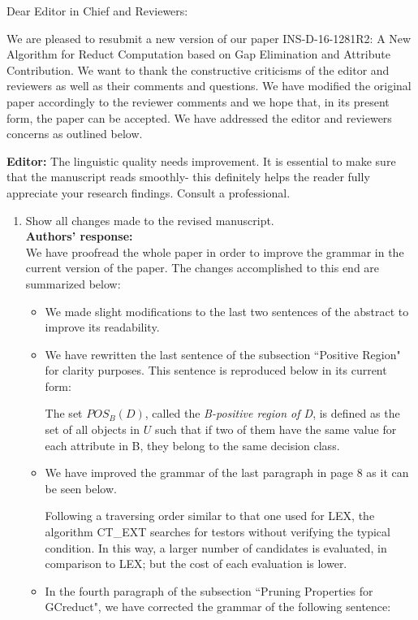 \documentclass{letter}
\begin{document}
\begin{letter}{}
  \opening{Dear Editor in Chief and Reviewers:}

  We are pleased to resubmit a new version of our paper INS-D-16-1281R2: A New Algorithm for Reduct Computation based on Gap Elimination and Attribute Contribution. We want to thank the constructive criticisms of the editor and reviewers as well as their comments and questions. We have modified the original paper accordingly to the reviewer comments and we hope that, in its present form, the paper can be accepted. We have addressed the editor and reviewers concerns as outlined below.

  \textbf{Editor:} 
  The linguistic quality needs improvement. It is essential to make sure that  the manuscript reads smoothly- this definitely helps the reader fully appreciate your research findings. Consult a professional. 
  \begin{enumerate}
	\item Show all changes made to the revised manuscript. \\
	\textbf{Authors’ response:} \\
	We have proofread the whole paper in order to improve the grammar in the current version of the paper. The changes accomplished to this end are summarized below:
	\begin{itemize}		
		\item We made slight modifications to the last two sentences of the abstract to improve its readability.
		 
		\item We have rewritten the last sentence of the subsection ``Positive Region"  for clarity purposes. This sentence is reproduced below in its current form:
		
		The set $POS_B(D)$, called the \textit{B-positive region of D}, is defined as the set of all objects in $U$ such that if two of them have the same value for each attribute in B, they belong to the same decision class.
		
		\item We have improved the grammar of the last paragraph in page 8 as it can be seen below.
		
		Following a traversing order similar to that one used for LEX, the algorithm CT\_EXT searches for testors without verifying the typical condition. In this way, a larger number of candidates is evaluated, in comparison to LEX; but the cost of each evaluation is lower.
		
		\item In the fourth paragraph of the subsection ``Pruning Properties for GCreduct", we have corrected the grammar of the following sentence:
		

\end{itemize}
\end{enumerate}
\end{letter}
\end{document}
